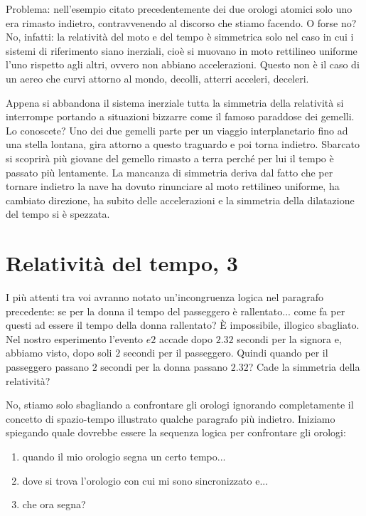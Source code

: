 Problema: nell'esempio citato precedentemente dei due orologi atomici solo uno era rimasto indietro, contravvenendo al discorso che stiamo facendo. O forse no? No, infatti: la relatività del moto e del tempo è simmetrica solo nel caso in cui i sistemi di riferimento siano inerziali, cioè si muovano in moto rettilineo uniforme l'uno rispetto agli altri, ovvero non abbiano accelerazioni. Questo non è il caso di un aereo che curvi attorno al mondo, decolli, atterri acceleri, deceleri. 

Appena si abbandona il sistema inerziale tutta la simmetria della relatività si interrompe portando a situazioni bizzarre come il famoso paraddose dei gemelli. Lo conoscete? Uno dei due gemelli parte per un viaggio interplanetario fino ad una stella lontana, gira attorno a questo traguardo e poi torna indietro. Sbarcato si scoprirà più giovane del gemello rimasto a terra perché per lui il tempo è passato più lentamente. La mancanza di simmetria deriva dal fatto che per tornare indietro la nave ha dovuto rinunciare al moto rettilineo uniforme, ha cambiato direzione, ha subito delle accelerazioni e la simmetria della dilatazione del tempo si è spezzata.


\section{Relatività del tempo, 3}

I più attenti tra voi avranno notato un'incongruenza logica nel paragrafo precedente: se per la donna il tempo del passeggero è rallentato... come fa per questi ad essere il tempo della donna rallentato? È impossibile, illogico sbagliato. Nel nostro esperimento l'evento $e2$ accade dopo $2.32$ secondi per la signora e, abbiamo visto, dopo soli $2$ secondi per il passeggero. Quindi quando per il passeggero passano $2$ secondi per la donna passano $2.32$? Cade la simmetria della relatività?

No, stiamo solo sbagliando a confrontare gli orologi ignorando completamente il concetto di spazio-tempo illustrato qualche paragrafo più indietro. Iniziamo spiegando quale dovrebbe essere la sequenza logica per confrontare gli orologi:

\begin{enumerate}
 \item quando il mio orologio segna un certo tempo...
 \item dove si trova l'orologio con cui mi sono sincronizzato e...
 \item che ora segna? 
\end{enumerate}

